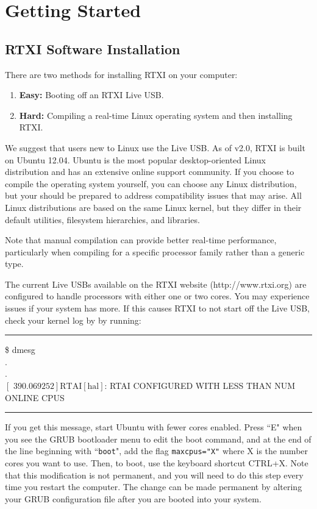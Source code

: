 \chapter{Getting Started}

\section{RTXI Software Installation}
There are two methods for installing RTXI on your computer:
\begin{enumerate}
\item \textbf{Easy:} Booting off an RTXI Live USB.
\item \textbf{Hard:} Compiling a real-time Linux operating system and then installing RTXI.
\end{enumerate}


We suggest that users new to Linux use the Live USB. As of v2.0, RTXI is built on Ubuntu 12.04. Ubuntu is the most popular desktop-oriented Linux distribution and has an extensive online support community. If you choose to compile the operating system yourself, you can choose any Linux distribution, but your should be prepared to address compatibility issues that may arise. All Linux distributions are based on the same Linux kernel, but they differ in their default utilities, filesystem hierarchies, and libraries. 

Note that manual compilation can provide better real-time performance, particularly when compiling for a specific processor family rather than a generic type. 

\attention
The current Live USBs available on the RTXI website (http://www.rtxi.org) are configured to handle processors with either one or two cores. You may experience issues if your system has more. If this causes RTXI to not start off the Live USB, check your kernel log by by running:
\bigskip
\begin{example}
\hrule\bigskip
\$ dmesg\\
.\\
.\\
$\left[\textrm{ 390.069252}\right] \textrm{RTAI}\left[\textrm{hal}\right]$: RTAI CONFIGURED WITH LESS THAN NUM ONLINE CPUS
\bigskip
\hrule\bigskip
\end{example}

If you get this message, start Ubuntu with fewer cores enabled. Press ``E" when you see the GRUB bootloader menu to edit the boot command, and at the end of the line beginning with ``\texttt{boot}", add the flag \texttt{maxcpus="X"} where X is the number cores you want to use. Then, to boot, use the keyboard shortcut CTRL+X. Note that this modification is not permanent, and you will need to do this step every time you restart the computer. The change can be made permanent by altering your GRUB configuration file after you are booted into your system. 